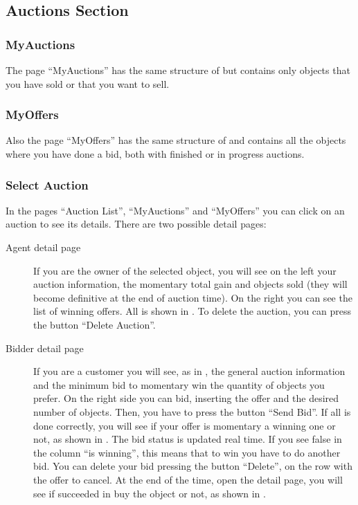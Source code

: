 \subsection{Auctions Section}\label{subsec:manualauction}

\subsubsection{MyAuctions}

The page ``MyAuctions'' has the same structure of  but
contains only objects that you have sold or that you want to sell.

\subsubsection{MyOffers}

Also the page ``MyOffers'' has the same structure of  and
contains all the objects where you have done a bid, both with finished or in
progress auctions.

\subsubsection{Select Auction}

In the pages ``Auction List'', ``MyAuctions'' and ``MyOffers'' you can click on
an auction to see its details. There are two possible detail pages:
\begin{description}
	\item[Agent detail page] If you are the owner of the selected object,
		you will see on the left your auction information, the momentary
		total gain and objects sold (they will become definitive at the
		end of auction time). On the right you can see the list of
		winning offers. All is shown in . To
		delete the auction, you can press the button ``Delete Auction''.
	\item[Bidder detail page] If you are a customer you will see, as in
		, the general auction information
		and the minimum bid to momentary win the quantity of objects you
		prefer.  On the right side you can bid, inserting the offer and
		the desired number of objects. Then, you have to press the
		button ``Send Bid''.  If all is done correctly, you will see if
		your offer is momentary a winning one or not, as shown in
		. The bid status is updated real time. If you
		see false in the column ``is winning'', this means that to win
		you have to do another bid. You can delete your bid pressing the
		button ``Delete'', on the row with the offer to cancel. At the
		end of the time, open the detail page, you will see if succeeded
		in buy the object or not, as shown in .
\end{description}

